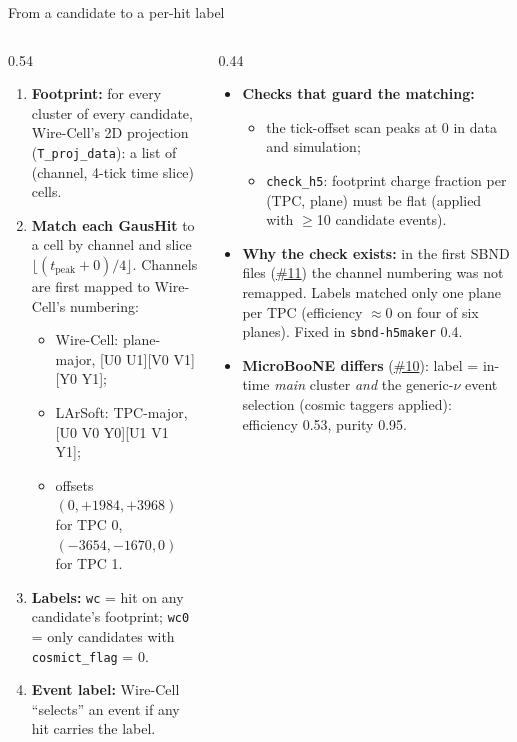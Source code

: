 \documentclass[aspectratio=169,10pt]{beamer}
\newcommand{\code}[1]{\texttt{#1}}
\newcommand{\gh}{https://github.com/HaiwangYu/fm4npp-lartpc}
\newcommand{\iss}[1]{\href{\gh/issues/#1}{\color{blue!60!black}\##1}}
\begin{document}
\begin{frame}{From a candidate to a per-hit label}
  \footnotesize
  \begin{columns}[T]
    \begin{column}{0.54\textwidth}
      \begin{enumerate}\setlength{\itemsep}{4pt}
        \item \textbf{Footprint:} for every cluster of every candidate, Wire-Cell's 2D projection (\code{T\_proj\_data}): a list of
          (channel, 4-tick time slice) cells.
        \item \textbf{Match each GausHit} to a cell by channel and slice $\lfloor(t_\mathrm{peak} + 0)/4\rfloor$.
          Channels are first mapped to Wire-Cell's numbering:
          \begin{itemize}
            \item Wire-Cell: plane-major, [U0 U1][V0 V1][Y0 Y1];
            \item LArSoft: TPC-major, [U0 V0 Y0][U1 V1 Y1];
            \item offsets $(0, +1984, +3968)$ for TPC 0, $(-3654, -1670, 0)$ for TPC 1.
          \end{itemize}
        \item \textbf{Labels:} \code{wc} = hit on any candidate's footprint; \code{wc0} = only candidates with \code{cosmict\_flag} = 0.
        \item \textbf{Event label:} Wire-Cell ``selects'' an event if any hit carries the label.
      \end{enumerate}
    \end{column}
    \begin{column}{0.44\textwidth}
      \begin{itemize}\setlength{\itemsep}{4pt}
        \item \textbf{Checks that guard the matching:}
          \begin{itemize}
            \item the tick-offset scan peaks at 0 in data and simulation;
            \item \code{check\_h5}: footprint charge fraction per (TPC, plane) must be flat (applied with $\ge$10 candidate events).
          \end{itemize}
        \item \textbf{Why the check exists:} in the first SBND files (\iss{11}) the channel numbering was not remapped. Labels
          matched only one plane per TPC (efficiency $\approx$0 on four of six planes). Fixed in \code{sbnd-h5maker} 0.4.
        \item \textbf{MicroBooNE differs} (\iss{10}): label = in-time \emph{main} cluster \emph{and} the generic-$\nu$
          event selection (cosmic taggers applied): efficiency 0.53, purity 0.95.
      \end{itemize}
    \end{column}
  \end{columns}
\end{frame}
\end{document}
